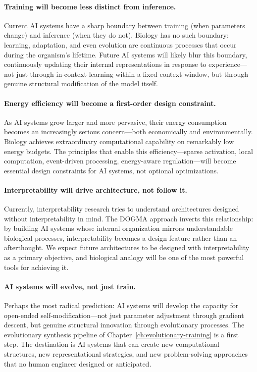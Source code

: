 \paragraph{Training will become less distinct from inference.} Current AI systems have a sharp boundary between training (when parameters change) and inference (when they do not). Biology has no such boundary: learning, adaptation, and even evolution are continuous processes that occur during the organism's lifetime. Future AI systems will likely blur this boundary, continuously updating their internal representations in response to experience---not just through in-context learning within a fixed context window, but through genuine structural modification of the model itself.

\paragraph{Energy efficiency will become a first-order design constraint.} As AI systems grow larger and more pervasive, their energy consumption becomes an increasingly serious concern---both economically and environmentally. Biology achieves extraordinary computational capability on remarkably low energy budgets. The principles that enable this efficiency---sparse activation, local computation, event-driven processing, energy-aware regulation---will become essential design constraints for AI systems, not optional optimizations.

\paragraph{Interpretability will drive architecture, not follow it.} Currently, interpretability research tries to understand architectures designed without interpretability in mind. The DOGMA approach inverts this relationship: by building AI systems whose internal organization mirrors understandable biological processes, interpretability becomes a design feature rather than an afterthought. We expect future architectures to be designed with interpretability as a primary objective, and biological analogy will be one of the most powerful tools for achieving it.

\paragraph{AI systems will evolve, not just train.} Perhaps the most radical prediction: AI systems will develop the capacity for open-ended self-modification---not just parameter adjustment through gradient descent, but genuine structural innovation through evolutionary processes. The evolutionary synthesis pipeline of Chapter~\ref{ch:evolutionary-training} is a first step. The destination is AI systems that can create new computational structures, new representational strategies, and new problem-solving approaches that no human engineer designed or anticipated.


